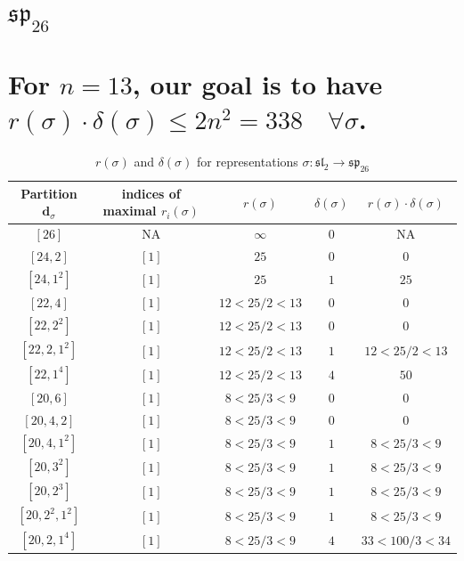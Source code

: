 \documentclass{article}%
\begin{document}
\newpage

%
\section{$\mathfrak{sp}_{26}$}%
\section*{For $n=13$, our goal is to have $r(\sigma) \cdot \delta(\sigma) \leq 2n^2 = 338 \quad \forall \sigma$.}%

%
\linebreak%

    \begin{center}
    \label{table:sp_26}
    \begin{longtable}{||c|c|c|c|c||}
    \caption{$r(\sigma)$ and $\delta(\sigma)$ for representations $\sigma: \mathfrak{sl}_2 \to \mathfrak{sp}_{26}$}
    \hline
    Partition $\textbf{d}_\sigma$
    &indices of maximal $r_i(\sigma)$
    &$r(\sigma)$
    &$\delta(\sigma)$
    &$r(\sigma) \cdot \delta(\sigma)$
    \\ [0.3ex] \hline\endhead
    $[26]$ & NA & $\infty$ & $0$ & NA \\ \hline 
$[24, 2]$ & $[1]$ & $25$ & $0$ & $0$ \\ \hline 
$[24, 1^{2}]$ & $[1]$ & $25$ & $1$ & $25$ \\ \hline 
$[22, 4]$ & $[1]$ & $12 < 25/2 < 13$ & $0$ & $0$ \\ \hline 
$[22, 2^{2}]$ & $[1]$ & $12 < 25/2 < 13$ & $0$ & $0$ \\ \hline 
$[22, 2, 1^{2}]$ & $[1]$ & $12 < 25/2 < 13$ & $1$ & $12 < 25/2 < 13$ \\ \hline 
$[22, 1^{4}]$ & $[1]$ & $12 < 25/2 < 13$ & $4$ & $50$ \\ \hline 
$[20, 6]$ & $[1]$ & $8 < 25/3 < 9$ & $0$ & $0$ \\ \hline 
$[20, 4, 2]$ & $[1]$ & $8 < 25/3 < 9$ & $0$ & $0$ \\ \hline 
$[20, 4, 1^{2}]$ & $[1]$ & $8 < 25/3 < 9$ & $1$ & $8 < 25/3 < 9$ \\ \hline 
$[20, 3^{2}]$ & $[1]$ & $8 < 25/3 < 9$ & $1$ & $8 < 25/3 < 9$ \\ \hline 
$[20, 2^{3}]$ & $[1]$ & $8 < 25/3 < 9$ & $1$ & $8 < 25/3 < 9$ \\ \hline 
$[20, 2^{2}, 1^{2}]$ & $[1]$ & $8 < 25/3 < 9$ & $1$ & $8 < 25/3 < 9$ \\ \hline 
$[20, 2, 1^{4}]$ & $[1]$ & $8 < 25/3 < 9$ & $4$ & $33 < 100/3 < 34$ \\ \hline 

\end{longtable}
\end{center}
\end{document}
